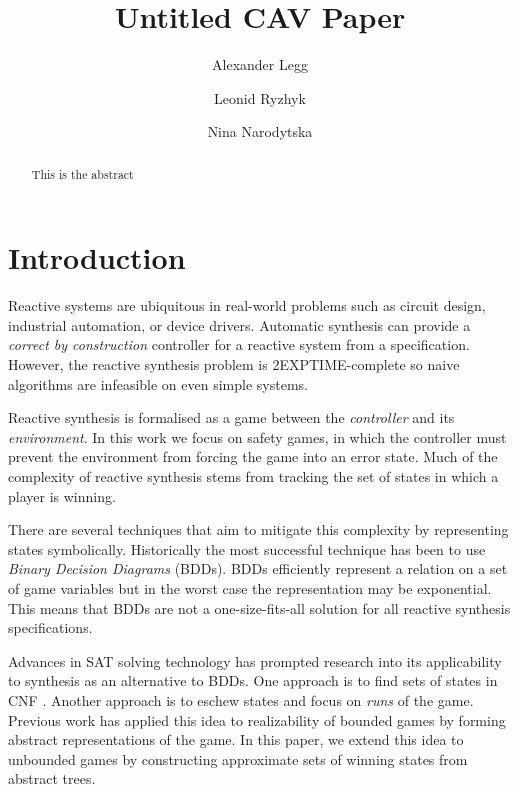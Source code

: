 \documentclass{llncs}
\begin{document}
\title{Untitled CAV Paper}

\author{Alexander Legg 
    \and Leonid Ryzhyk
    \and Nina Narodytska}


\maketitle

\begin{abstract}
    This is the abstract
\end{abstract}

\section{Introduction}

Reactive systems are ubiquitous in real-world problems such as circuit design,
industrial automation, or device drivers. Automatic synthesis can provide a
\emph{correct by construction} controller for a reactive system from a
specification.  However, the reactive synthesis problem is 2EXPTIME-complete so
naive algorithms are infeasible on even simple systems.

Reactive synthesis is formalised as a game between the \emph{controller} and
its \emph{environment}. In this work we focus on safety games, in which the
controller must prevent the environment from forcing the game into an error
state.  Much of the complexity of reactive synthesis stems from tracking the
set of states in which a player is winning.

There are several techniques that aim to mitigate this complexity by
representing states symbolically.  Historically the most successful technique
has been to use \emph{Binary Decision Diagrams} (BDDs).  BDDs efficiently
represent a relation on a set of game variables but in the worst case the
representation may be exponential. This means that BDDs are not a
one-size-fits-all solution for all reactive synthesis specifications.

Advances in SAT solving technology has prompted research into its applicability
to synthesis as an alternative to BDDs. One approach is to find sets of states
in CNF \cite{demiurge}. Another approach is to eschew states and focus on
\emph{runs} of the game. Previous work has applied this idea to realizability
of bounded games \cite{nina} by forming abstract representations of the game.
In this paper, we extend this idea to unbounded games by constructing
approximate sets of winning states from abstract trees.
\end{document}
